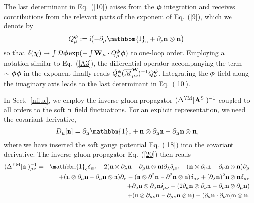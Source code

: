 \documentclass[a4paper,12pt]{article}
\newcommand{\I}{\text{i}}
\newcommand{\re}[1]{~(\ref{#1})}
\begin{document}
The last determinant in Eq.\re{10} arises from the $\boldsymbol{\phi}$ integration
and receives contributions from the relevant parts of the exponent of
Eq.\re{9}, which we denote by
\begin{equation}
Q^{\mF}_\mu:= \I \bigl( -\partial_\mu \mathbbm{1}_{\text{c}} +
\partial_\mu\mn \otimes \mn\bigr), \label{A4}
\end{equation}
so that $\delta(\boldsymbol{\chi})\to \int {\cal D}\boldsymbol{\phi} \exp (-\int\mathbf{W}_\mu \cdot
Q^{\boldsymbol{\phi}}_\mu \boldsymbol{\phi})$ to one-loop order.  Employing a notation similar to
Eq.\re{A3}, the differential operator accompanying the term $\sim
\boldsymbol{\phi}\boldsymbol{\phi}$ in the exponent finally reads $\widetilde{Q}^{\boldsymbol{\phi}}_\mu
(\overline{M}^{\mathbf{W}}_{\mu\nu})^{-1} Q^{\boldsymbol{\phi}}_\nu$. Integrating the $\boldsymbol{\phi}$
field along the imaginary axis leads to the last determinant in
Eq.\re{10}.

In Sect.~\ref{nfluc}, we employ the inverse gluon propagator
$(\Delta^{\text{YM}}[\mathbf{A}^{\text{S}}])^{-1}$ coupled to all orders to
the soft $\mathbf{n}$ field fluctuations. For an explicit representation, we
need the covariant derivative,
\begin{equation}
D_\mu[\mn]=\partial_\mu \mathbbm{1}_{\text{c}}+ 
\mn\otimes\partial_\mu\mn -\partial_\mu\mn\otimes\mn, \label{A5}
\end{equation}
where we have inserted the soft gauge potential Eq.\re{18} into the
covariant derivative. The inverse gluon propagator Eq.\re{20} then
reads
\begin{eqnarray}
(\Delta^{\text{YM}}[\mn])^{-1}_{\mu\nu}
&=&\mathbbm{1}_{\text{c}}\delta_{\mu\nu}
-2(\mn\otimes\partial_\lambda\mn -\partial_\mu\mn\otimes\mn)
  \partial_\lambda\delta_{\mu\nu}
+(\mn\otimes\partial_\nu\mn-\partial_\nu\mn\otimes\mn)\partial_\mu
\nonumber\\
&&+(\mn\otimes\partial_\mu\mn-\partial_\mu\mn\otimes\mn)\partial_\nu 
-(\mn\otimes\partial^2\mn-\partial^2\mn\otimes\mn)\delta_{\mu\nu}
+(\partial_\lambda\mn)^2\mn\otimes\mn \delta_{\mu\nu}\nonumber\\
&&+\partial_\lambda\mn\otimes\partial_\lambda\mn \delta_{\mu\nu}
-(2\partial_\mu\mn\otimes\partial_\nu\mn -\partial_\nu\mn\otimes
   \partial_\mu\mn)\nonumber\\
&&+(\mn\otimes\partial_{\mu\nu}\mn -\partial_{\mu\nu}\mn\otimes\mn)
-(\partial_\mu\mn\cdot\partial_\nu\mn)\mn\otimes\mn. \label{A6}
\end{eqnarray}
\end{document}
